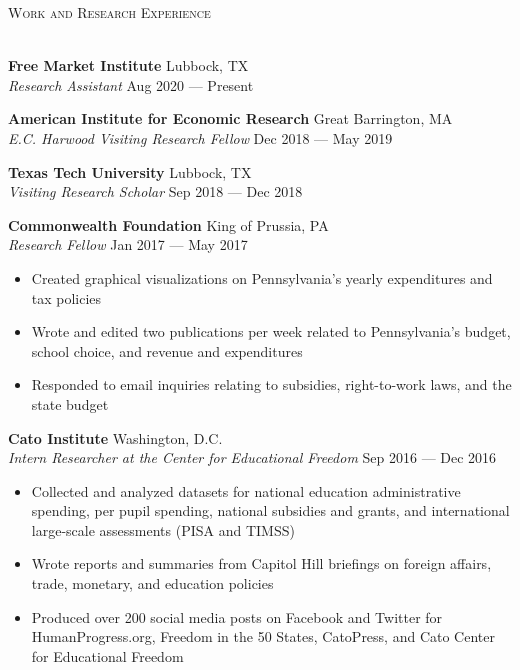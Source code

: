 \documentclass[a4paper,11pt]{article}
\newcommand{\lineunder} {
    \vspace*{-8pt} \\
    \hspace*{-18pt} \hrulefill \\
}
\newcommand{\header} [1] {
    {\hspace*{-18pt}\vspace*{6pt} \textsc{\large{#1}}}
    \vspace*{-6pt} \lineunder
}
\begin{document}
\header{Work and Research Experience}
\vspace{1mm}

\textbf{Free Market Institute} \hfill Lubbock, TX\\
\textit{Research Assistant} \hfill Aug 2020 --- Present \\
\vspace{1mm}

\textbf{American Institute for Economic Research} \hfill Great Barrington, MA\\
\textit{E.C. Harwood Visiting Research Fellow} \hfill Dec 2018 --- May 2019\\
\vspace{1mm}

\textbf{Texas Tech University} \hfill Lubbock, TX\\
\textit{Visiting Research Scholar} \hfill Sep 2018 --- Dec 2018\\
\vspace{1mm}

\textbf{Commonwealth Foundation} \hfill King of Prussia, PA\\
\textit{Research Fellow} \hfill Jan 2017 --- May 2017\\
\begin{itemize}[noitemsep,nolistsep]
	\item Created graphical visualizations on Pennsylvania’s yearly expenditures and tax policies
	\item Wrote and edited two publications per week related to Pennsylvania's budget, school choice, and revenue and expenditures
	\item Responded to email inquiries relating to subsidies, right-to-work laws, and the state budget
\end{itemize}
\vspace{1mm}

\textbf{Cato Institute} \hfill Washington, D.C.\\
\textit{Intern Researcher at the Center for Educational Freedom} \hfill Sep 2016 --- Dec 2016\\
\begin{itemize}[noitemsep,nolistsep]
	\item Collected and analyzed datasets for national education administrative spending, per pupil spending, national subsidies and grants, and international large-scale assessments (PISA and TIMSS)
	\item Wrote reports and summaries from Capitol Hill briefings on foreign affairs, trade, monetary, and education policies
	\item Produced over 200 social media posts on Facebook and Twitter for HumanProgress.org, Freedom in the 50 States, CatoPress, and Cato Center for Educational Freedom
\end{itemize}
\vspace{2mm}
\end{document}
